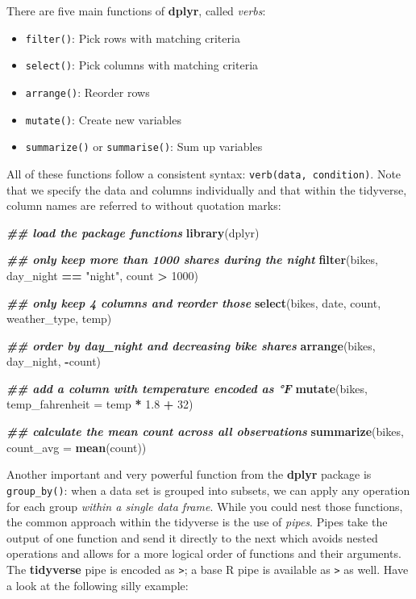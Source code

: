 \documentclass[
]{krantz}
\makeatletter
\newenvironment{Shaded}{\begin{snugshade}}{\end{snugshade}}
\newcommand{\AttributeTok}[1]{\textcolor[rgb]{0.27,0.27,0.27}{#1}}
\newcommand{\DecValTok}[1]{\textcolor[rgb]{0.06,0.06,0.06}{#1}}
\newcommand{\DocumentationTok}[1]{\textcolor[rgb]{0.37,0.37,0.37}{\textbf{\textit{#1}}}}
\newcommand{\FloatTok}[1]{\textcolor[rgb]{0.06,0.06,0.06}{#1}}
\newcommand{\FunctionTok}[1]{\textcolor[rgb]{0.27,0.27,0.27}{\textbf{#1}}}
\newcommand{\NormalTok}[1]{#1}
\newcommand{\SpecialCharTok}[1]{\textcolor[rgb]{0.43,0.43,0.43}{\textbf{#1}}}
\newcommand{\StringTok}[1]{\textcolor[rgb]{0.5,0.5,0.5}{#1}}
\providecommand{\tightlist}{%
  \setlength{\itemsep}{0pt}\setlength{\parskip}{0pt}}
\newenvironment{kframe}{%
\medskip{}
\setlength{\fboxsep}{.8em}
 \def\at@end@of@kframe{}%
 \ifinner\ifhmode%
  \def\at@end@of@kframe{\end{minipage}}%
  \begin{minipage}{\columnwidth}%
 \fi\fi%
 \def\FrameCommand##1{\hskip\@totalleftmargin \hskip-\fboxsep
 \colorbox{shadecolor}{##1}\hskip-\fboxsep
     \hskip-\linewidth \hskip-\@totalleftmargin \hskip\columnwidth}%
 \MakeFramed {\advance\hsize-\width
   \@totalleftmargin\z@ \linewidth\hsize
   \@setminipage}}%
 {\par\unskip\endMakeFramed%
 \at@end@of@kframe}
\renewenvironment{Shaded}{\begin{kframe}}{\end{kframe}}
\makeatother
\begin{document}
There are five main functions of \textbf{dplyr}, called \emph{verbs}:

\begin{itemize}
\tightlist
\item
  \texttt{filter()}: Pick rows with matching criteria
\item
  \texttt{select()}: Pick columns with matching criteria
\item
  \texttt{arrange()}: Reorder rows
\item
  \texttt{mutate()}: Create new variables
\item
  \texttt{summarize()} or \texttt{summarise()}: Sum up variables
\end{itemize}

All of these functions follow a consistent syntax: \texttt{verb(data,\ condition)}. Note that we specify the data and columns individually and that within the tidyverse, column names are referred to without quotation marks:

\begin{Shaded}
\begin{Highlighting}[]
\DocumentationTok{\#\# load the package functions}
\FunctionTok{library}\NormalTok{(dplyr)}

\DocumentationTok{\#\# only keep more than 1000 shares during the night}
\FunctionTok{filter}\NormalTok{(bikes, day\_night }\SpecialCharTok{==} \StringTok{"night"}\NormalTok{, count }\SpecialCharTok{\textgreater{}} \DecValTok{1000}\NormalTok{) }

\DocumentationTok{\#\# only keep 4 columns and reorder those}
\FunctionTok{select}\NormalTok{(bikes, date, count, weather\_type, temp) }

\DocumentationTok{\#\# order by day\_night and decreasing bike shares}
\FunctionTok{arrange}\NormalTok{(bikes, day\_night, }\SpecialCharTok{{-}}\NormalTok{count) }

\DocumentationTok{\#\# add a column with temperature encoded as °F}
\FunctionTok{mutate}\NormalTok{(bikes, }\AttributeTok{temp\_fahrenheit =}\NormalTok{ temp }\SpecialCharTok{*} \FloatTok{1.8} \SpecialCharTok{+} \DecValTok{32}\NormalTok{)}

\DocumentationTok{\#\# calculate the mean count across all observations}
\FunctionTok{summarize}\NormalTok{(bikes, }\AttributeTok{count\_avg =} \FunctionTok{mean}\NormalTok{(count)) }
\end{Highlighting}
\end{Shaded}

Another important and very powerful function from the \textbf{dplyr} package is \texttt{group\_by()}: when a data set is grouped into subsets, we can apply any operation for each group \emph{within a single data frame}. While you could nest those functions, the common approach within the tidyverse is the use of \emph{pipes}. Pipes take the output of one function and send it directly to the next which avoids nested operations and allows for a more logical order of functions and their arguments. The \textbf{tidyverse} pipe is encoded as \texttt{\textbar{}\textgreater{}}; a base R pipe is available as \texttt{\textbar{}\textgreater{}} as well. Have a look at the following silly example:
\end{document}
